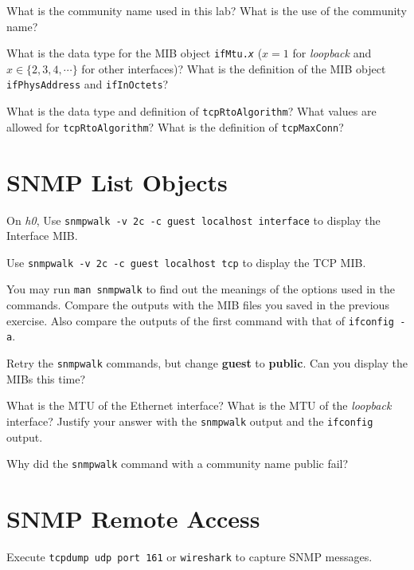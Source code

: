 \documentclass{../UTNetLab}
\begin{document}
    \begin{report}
    \item What is the community name used in this lab? What is the use of the
    community name?
    
    \item What is the data type for the MIB object \texttt{ifMtu.\textit{x}} ($x=1$ for \textit{loopback} and $x \in \{2,3,4,\cdots\}$ for other interfaces)? What is the definition of the MIB object \texttt{ifPhysAddress} and \texttt{ifInOctets}?
    
    \item What is the data type and definition of \texttt{tcpRtoAlgorithm}? What values are allowed for \texttt{tcpRtoAlgorithm}? What is the definition of \texttt{tcpMaxConn}?
    \end{report}

\section{SNMP List Objects}
    On \textit{h0},
    Use \lstinline[emph=guest]{snmpwalk -v 2c -c guest localhost interface} to display the Interface MIB.

    Use \lstinline[emph=guest]{snmpwalk -v 2c -c guest localhost tcp} to display the TCP MIB.

    You may run \lstinline{man snmpwalk} to find out the meanings of the options used in the commands.
    Compare the outputs with the MIB files you saved in the previous exercise.
    Also compare the outputs of the first command with that of \lstinline{ifconfig -a}.

    Retry the \lstinline{snmpwalk} commands, but change \textbf{guest} to \textbf{public}.
    Can you display the MIBs this time?
    
    \begin{report}
    \item What is the MTU of the Ethernet interface? What is the MTU of the \textit{loopback} interface? Justify your answer with the \lstinline{snmpwalk} output and the \lstinline{ifconfig} output.
    
    \item Why did the \lstinline{snmpwalk} command with a community name public fail?
    \end{report}

\section{SNMP Remote Access}
    Execute \lstinline{tcpdump udp port 161} or \lstinline{wireshark} to capture SNMP messages.
\end{document}
